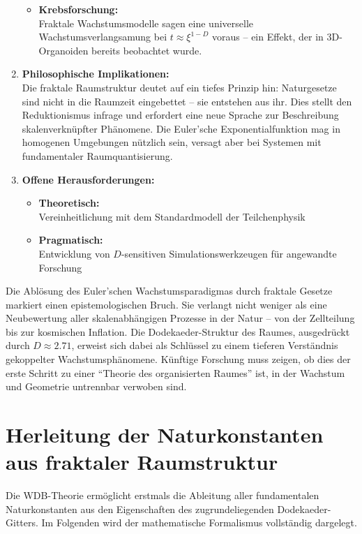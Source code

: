 \begin{enumerate}
\begin{itemize}
        \item \textbf{Krebsforschung:}\\Fraktale Wachstumsmodelle sagen eine universelle Wachstumsverlangsamung bei $t \approx \xi^{1-D}$ voraus – ein Effekt, der in 3D-Organoiden bereits beobachtet wurde.
    \end{itemize}
    \item \textbf{Philosophische Implikationen:}\\Die fraktale Raumstruktur deutet auf ein tiefes Prinzip hin: Naturgesetze sind nicht in die Raumzeit eingebettet – sie entstehen aus ihr. Dies stellt den Reduktionismus infrage und erfordert eine neue Sprache zur Beschreibung skalenverknüpfter Phänomene. Die Euler'sche Exponentialfunktion mag in homogenen Umgebungen nützlich sein, versagt aber bei Systemen mit fundamentaler Raumquantisierung.
    \item \textbf{Offene Herausforderungen:}
    \begin{itemize}
        \item \textbf{Theoretisch:}\\Vereinheitlichung mit dem Standardmodell der Teilchenphysik
        \item \textbf{Pragmatisch:}\\Entwicklung von $D$-sensitiven Simulationswerkzeugen für angewandte Forschung
    \end{itemize}
\end{enumerate}
Die Ablösung des Euler'schen Wachstumsparadigmas durch fraktale Gesetze markiert einen epistemologischen Bruch. Sie verlangt nicht weniger als eine Neubewertung aller skalenabhängigen
Prozesse in der Natur – von der Zellteilung bis zur kosmischen Inflation. Die Dodekaeder-Struktur des Raumes, ausgedrückt durch $D \approx 2.71$, erweist sich dabei als Schlüssel zu
einem tieferen Verständnis gekoppelter Wachstumsphänomene. Künftige Forschung muss zeigen, ob dies der erste Schritt zu einer \enquote{Theorie des organisierten Raumes} ist, in der
Wachstum und Geometrie untrennbar verwoben sind.

\section{Herleitung der Naturkonstanten aus fraktaler Raumstruktur}
\label{sec:naturkonstanten}

Die WDB-Theorie ermöglicht erstmals die Ableitung aller fundamentalen Naturkonstanten aus den Eigenschaften des zugrundeliegenden Dodekaeder-Gitters. Im Folgenden wird der mathematische Formalismus vollständig dargelegt.


